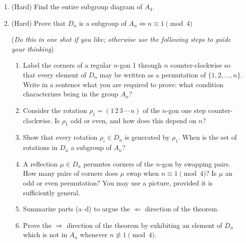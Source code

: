 \begin{exercises}
\begin{enumerate}
	  	
	 	\item\label{exs:a4subgroups} (Hard) Find the entire subgroup diagram of $A_4$.
	 	
	  
	  \item (Hard) Prove that $D_n$ is a subgroup of $A_n\iff n\equiv 1\pmod 4$\par
		(\emph{Do this in one shot if you like; otherwise use the following steps to guide your thinking})
		\begin{enumerate}
	   	\item Label the corners of a regular $n$-gon 1 through $n$ counter-clockwise so that every element of $D_n$ may be written as a permutation of $\{1,2,\ldots,n\}$. Write in a sentence what you are required to prove: what condition characterizes being in the group $A_n$?
	   	
	   	\item Consider the rotation $\rho_1=(1\,2\,3\,\cdots \,n)$ of the $n$-gon one step counter-clockwise. Is $\rho_1$ odd or even, and how does this depend on $n$?
	   	
	   	\item Show that every rotation $\rho_i\in D_n$ is generated by $\rho_1$. When is the set of rotations in $D_n$ a subgroup of $A_n$?
	   	
	   	\item A reflection $\mu\in D_n$ permutes corners of the $n$-gon by swapping pairs. How many pairs of corners does $\mu$ swap when $n\equiv 1\pmod 4$? Is $\mu$ an odd or even permutation? You may use a picture, provided it is sufficiently general.
	   	
	   	\item Summarize parts (a--d) to argue the $\Leftarrow$ direction of the theorem.
	   	
	   	\item Prove the $\Rightarrow$ direction of the theorem by exhibiting an element of $D_n$ which is not in $A_n$ whenever $n\not\equiv 1\pmod 4$.
	\end{enumerate}
	
	
	\end{enumerate}
\end{exercises}
